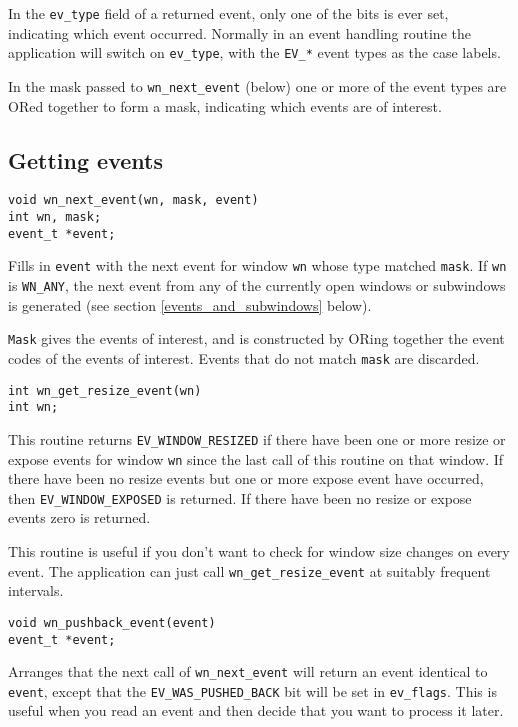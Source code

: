 In the {\tt ev\_type} field of a returned event, only one of the bits is
ever set, indicating which event occurred.
Normally in an event handling routine the application will switch on
{\tt ev\_type}, with the {\tt EV\_*} event types as the case labels.

In the mask passed to {\tt wn\_next\_event} (below) one or more of the
event types are ORed together to form a mask, indicating which events are
of interest.
\subsection{Getting events}
\begin{verbatim}
void wn_next_event(wn, mask, event)
int wn, mask;
event_t *event;
\end{verbatim}
Fills in {\tt event} with the next event for window {\tt wn} whose
type matched {\tt mask}.
If {\tt wn} is {\tt WN\_ANY}, the next event from any of the currently
open windows or subwindows is generated (see section \ref{events_and_subwindows}
below).

{\tt Mask} gives the events of interest, and is constructed by
ORing together the event codes of the events of interest.
Events that do not match {\tt mask} are discarded.

\begin{verbatim}
int wn_get_resize_event(wn)
int wn;
\end{verbatim}
This routine returns {\tt EV\_WINDOW\_RESIZED} if there have been one or
more resize or expose events for window {\tt wn} since the last call of
this routine on that window.
If there have been no resize events but one or more expose
event have occurred, then {\tt EV\_WINDOW\_EXPOSED} is returned.
If there have been no resize or expose events zero is returned.

This routine is useful if you don't want to check for window size changes
on every event.
The application can just call {\tt wn\_get\_resize\_event} at suitably
frequent intervals.
\begin{verbatim}
void wn_pushback_event(event)
event_t *event;
\end{verbatim}
Arranges that the next call of {\tt wn\_next\_event} will return an
event identical to {\tt event}, except that the {\tt EV\_WAS\_PUSHED\_BACK}
bit will be set in {\tt ev\_flags}.
This is useful when you read an event and then decide that you want to process it
later.
